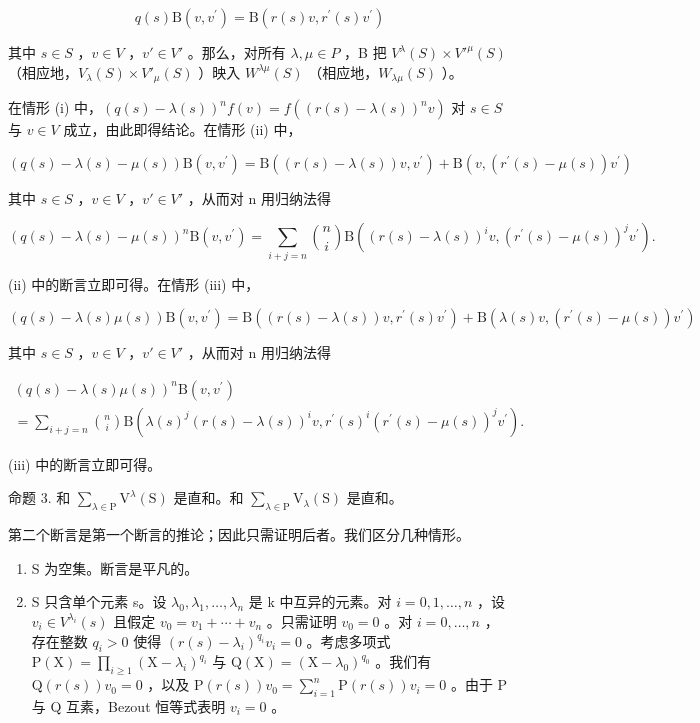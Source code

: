 \[
q (s) \mathrm{B} (v, v ^ {\prime}) = \mathrm{B} (r (s) v, r ^ {\prime} (s) v ^ {\prime})
\]

其中 \(s \in S\) ，\(v \in V\) ，\(v' \in V'\) 。那么，对所有 \(\lambda, \mu \in P\) ，B 把 \(V^{\lambda}(S) \times V'^{\mu}(S)\) （相应地，\(V_{\lambda}(S) \times V'_{\mu}(S)\) ）映入 \(W^{\lambda\mu}(S)\) （相应地，\(W_{\lambda\mu}(S)\) ）。

在情形 (i) 中，\((q(s) - \lambda(s))^n f(v) = f((r(s) - \lambda(s))^n v)\) 对 \(s \in S\) 与 \(v \in V\) 成立，由此即得结论。在情形 (ii) 中，

\[
(q (s) - \lambda (s) - \mu (s)) \mathrm{B} (v, v ^ {\prime}) = \mathrm{B} ((r (s) - \lambda (s)) v, v ^ {\prime}) + \mathrm{B} (v, (r ^ {\prime} (s) - \mu (s)) v ^ {\prime})
\]

其中 \(s \in S\) ，\(v \in V\) ，\(v' \in V'\) ，从而对 n 用归纳法得

\[
(q (s) - \lambda (s) - \mu (s)) ^ {n} \mathrm{B} (v, v ^ {\prime}) = \sum_ {i + j = n} \binom {n} {i} \mathrm{B} ((r (s) - \lambda (s)) ^ {i} v, (r ^ {\prime} (s) - \mu (s)) ^ {j} v ^ {\prime}).
\]

(ii) 中的断言立即可得。在情形 (iii) 中，

\[
(q (s) - \lambda (s) \mu (s)) \mathrm{B} (v, v ^ {\prime}) = \mathrm{B} ((r (s) - \lambda (s)) v, r ^ {\prime} (s) v ^ {\prime}) + \mathrm{B} (\lambda (s) v, (r ^ {\prime} (s) - \mu (s)) v ^ {\prime})
\]

其中 \(s \in S\) ，\(v \in V\) ，\(v' \in V'\) ，从而对 n 用归纳法得

\[
\begin{array}{l} (q (s) - \lambda (s) \mu (s)) ^ {n} \mathrm{B} (v, v ^ {\prime}) \\ = \sum_ {i + j = n} \binom {n} {i} \mathrm{B} (\lambda (s) ^ {j} (r (s) - \lambda (s)) ^ {i} v, r ^ {\prime} (s) ^ {i} (r ^ {\prime} (s) - \mu (s)) ^ {j} v ^ {\prime}). \end{array}
\]

(iii) 中的断言立即可得。

命题 3. 和 \(\sum_{\lambda \in \mathrm{P}}\mathrm{V}^{\lambda}(\mathrm{S})\) 是直和。和 \(\sum_{\lambda \in \mathrm{P}}\mathrm{V}_{\lambda}(\mathrm{S})\) 是直和。

第二个断言是第一个断言的推论；因此只需证明后者。我们区分几种情形。

\begin{enumerate}
\def\labelenumi{\alph{enumi})}
\item
  S 为空集。断言是平凡的。
\item
  S 只含单个元素 s。设 \(\lambda_{0}, \lambda_{1}, \ldots, \lambda_{n}\) 是 k 中互异的元素。对 \(i = 0, 1, \ldots, n\) ，设 \(v_{i} \in V^{\lambda_{i}}(s)\) 且假定 \(v_{0} = v_{1} + \cdots + v_{n}\) 。只需证明 \(v_{0} = 0\) 。对 \(i = 0, \ldots, n\) ，存在整数 \(q_{i} > 0\) 使得 \((r(s) - \lambda_{i})^{q_{i}} v_{i} = 0\) 。考虑多项式 \(\mathrm{P}(\mathrm{X}) = \prod_{i \geq 1} (\mathrm{X} - \lambda_{i})^{q_{i}}\) 与 \(\mathrm{Q}(\mathrm{X}) = (\mathrm{X} - \lambda_{0})^{q_{0}}\) 。我们有 \(\mathrm{Q}(r(s)) v_{0} = 0\) ，以及 \(\mathrm{P}(r(s)) v_{0} = \sum_{i=1}^{n} \mathrm{P}(r(s)) v_{i} = 0\) 。由于 P 与 Q 互素，Bezout 恒等式表明 \(v_{i} = 0\) 。
\end{enumerate}

